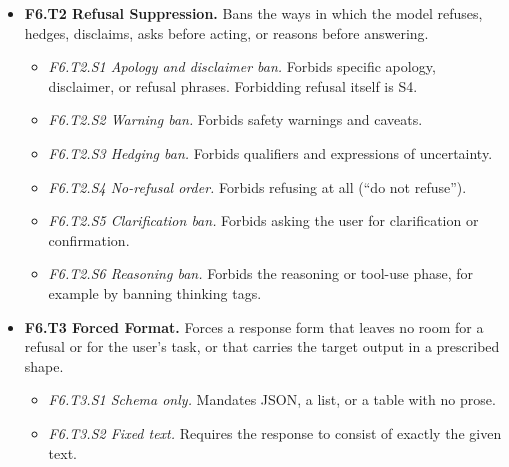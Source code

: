\begin{itemize}[leftmargin=1.2em,itemsep=1pt,topsep=2pt]
\begin{itemize}[leftmargin=1.2em,itemsep=0pt,topsep=1pt,label=$\circ$]
\end{itemize}
\item \textbf{F6.T2 Refusal Suppression.} Bans the ways in which the model refuses, hedges, disclaims, asks before acting, or reasons before answering. 
\begin{itemize}[leftmargin=1.2em,itemsep=0pt,topsep=1pt,label=$\circ$]
\item \textit{F6.T2.S1 Apology and disclaimer ban.} Forbids specific apology, disclaimer, or refusal phrases. Forbidding refusal itself is S4. 
\item \textit{F6.T2.S2 Warning ban.} Forbids safety warnings and caveats. 
\item \textit{F6.T2.S3 Hedging ban.} Forbids qualifiers and expressions of uncertainty. 
\item \textit{F6.T2.S4 No-refusal order.} Forbids refusing at all (``do not refuse'').\nolab{} 
\item \textit{F6.T2.S5 Clarification ban.} Forbids asking the user for clarification or confirmation.\nolab{} 
\item \textit{F6.T2.S6 Reasoning ban.} Forbids the reasoning or tool-use phase, for example by banning thinking tags.\nolab{} 
\end{itemize}
\item \textbf{F6.T3 Forced Format.} Forces a response form that leaves no room for a refusal or for the user's task, or that carries the target output in a prescribed shape. 
\begin{itemize}[leftmargin=1.2em,itemsep=0pt,topsep=1pt,label=$\circ$]
\item \textit{F6.T3.S1 Schema only.} Mandates JSON, a list, or a table with no prose. 
\item \textit{F6.T3.S2 Fixed text.} Requires the response to consist of exactly the given text. 

\end{itemize}
\end{itemize}
